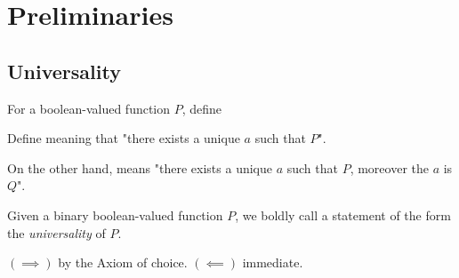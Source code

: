 \section{Preliminaries}



\subsection{Universality}

\begin{definition}
For a boolean-valued function $P$, define
\end{definition}
\begin{definition}
Define
meaning that "there exists a unique $a$ such that $P$".
\end{definition}
\begin{remark}
On the other hand,
means "there exists a unique $a$ such that $P$, moreover the $a$ is $Q$".
\end{remark}

\begin{definition}[Universality]
Given a binary boolean-valued function $P$, we boldly call a statement of the form
the \emph{universality} of $P$.
\end{definition}

\begin{proposition}
\end{proposition}
\begin{strdproof}
$(\implies)$ by the Axiom of choice. $(\impliedby)$ immediate.
\end{strdproof}

